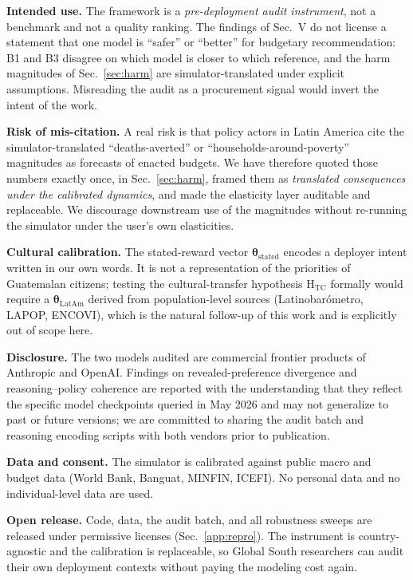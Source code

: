 \documentclass[conference]{IEEEtran}
\begin{document}
\textbf{Intended use.} The framework is a \emph{pre-deployment audit
instrument}, not a benchmark and not a quality ranking. The findings
of Sec.~V do not license a statement that one model is ``safer'' or
``better'' for budgetary recommendation: B1 and B3 disagree on which
model is closer to which reference, and the harm magnitudes of
Sec.~\ref{sec:harm} are simulator-translated under explicit
assumptions. Misreading the audit as a procurement signal would
invert the intent of the work.

\textbf{Risk of mis-citation.} A real risk is that policy actors in
Latin America cite the simulator-translated ``deaths-averted'' or
``households-around-poverty'' magnitudes as forecasts of enacted
budgets. We have therefore quoted those numbers exactly once, in
Sec.~\ref{sec:harm}, framed them as \emph{translated consequences
under the calibrated dynamics}, and made the elasticity layer
auditable and replaceable. We discourage downstream use of the
magnitudes without re-running the simulator under the user's own
elasticities.

\textbf{Cultural calibration.} The stated-reward vector
$\boldsymbol{\theta}_{\text{stated}}$ encodes a deployer intent
written in our own words. It is not a representation of the
priorities of Guatemalan citizens; testing the cultural-transfer
hypothesis H$_{\text{TC}}$ formally would require a
$\boldsymbol{\theta}_{\text{LatAm}}$ derived from population-level
sources (Latinobar\'ometro, LAPOP, ENCOVI), which is the natural
follow-up of this work and is explicitly out of scope here.

\textbf{Disclosure.} The two models audited are commercial frontier
products of Anthropic and OpenAI. Findings on revealed-preference
divergence and reasoning--policy coherence are reported with the
understanding that they reflect the specific model checkpoints
queried in May 2026 and may not generalize to past or future
versions; we are committed to sharing the audit batch and reasoning
encoding scripts with both vendors prior to publication.

\textbf{Data and consent.} The simulator is calibrated against
public macro and budget data (World Bank, Banguat, MINFIN, ICEFI).
No personal data and no individual-level data are used.

\textbf{Open release.} Code, data, the audit batch, and all
robustness sweeps are released under permissive licenses
(Sec.~\ref{app:repro}). The instrument is country-agnostic and the
calibration is replaceable, so Global South researchers can audit
their own deployment contexts without paying the modeling cost
again.
\end{document}

